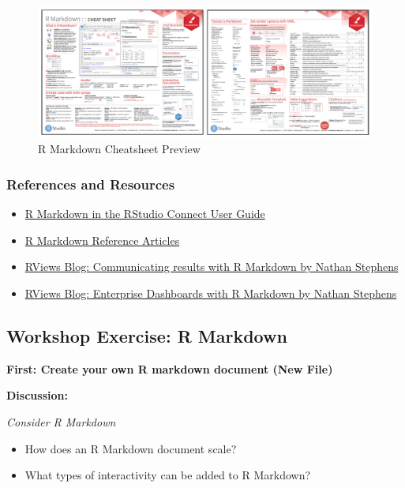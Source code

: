 \documentclass[]{book}
\providecommand{\tightlist}{%
  \setlength{\itemsep}{0pt}\setlength{\parskip}{0pt}}
\theoremstyle{definition}
\theoremstyle{definition}
\theoremstyle{definition}
\theoremstyle{remark}
\begin{document}
\begin{figure}
\centering
\includegraphics{imgs/shiny-alt/rmd-cheatsheet.png}
\caption{R Markdown Cheatsheet Preview}
\end{figure}

\hypertarget{references-and-resources-3}{%
\subsubsection{References and
Resources}\label{references-and-resources-3}}

\begin{itemize}
\tightlist
\item
  \href{https://docs.rstudio.com/connect/user/r-markdown.html}{R
  Markdown in the RStudio Connect User Guide}
\item
  \href{https://rmarkdown.rstudio.com/articles.html}{R Markdown
  Reference Articles}
\item
  \href{https://rviews.rstudio.com/2018/11/01/r-markdown-a-better-approach/}{RViews
  Blog: Communicating results with R Markdown by Nathan Stephens}
\item
  \href{https://rviews.rstudio.com/2018/05/16/replacing-excel-reports-with-r-markdown-and-shiny/}{RViews
  Blog: Enterprise Dashboards with R Markdown by Nathan Stephens}
\end{itemize}

\hypertarget{workshop-exercise-r-markdown}{%
\subsection{Workshop Exercise: R
Markdown}\label{workshop-exercise-r-markdown}}

\textbf{First: Create your own R markdown document (New File)}

\textbf{Discussion:}

\emph{Consider R Markdown}

\begin{itemize}
\tightlist
\item
  How does an R Markdown document scale?
\item
  What types of interactivity can be added to R Markdown?
\end{itemize}
\end{document}
